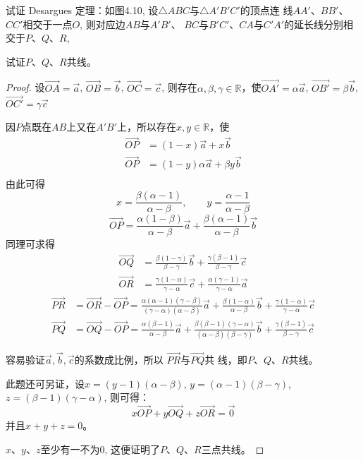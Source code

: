 \begin{example}
    试证 Desargues 定理：如图4.10, 设$\triangle ABC$与$\triangle A'B'C'$的顶点连
    线$AA'$、$BB'$、$CC'$相交于一点$O$, 则对应边$AB$与$A'B'$、
    $BC$与$B'C'$、$CA$与$C'A'$的延长线分别相交于$P$、$Q$、$R$, 
    
    试证$P$、$Q$、$R$共线。
\end{example}

\begin{proof}
    设$\Vec{OA}=\vec{a}$, $\Vec{OB}=\vec{b}$, $\Vec{OC}=\vec{c}$, 则存在$\alpha,\beta,\gamma\in \mathbb{R}$，使$\Vec{OA'}=\alpha\vec{a}$, $\Vec{OB'}=\beta\vec{b}$, $\Vec{OC'}=\gamma\vec{c}$

    因$P$点既在$AB$上又在$A'B'$上，所以存在$x,y\in\mathbb{R}$，使
\[\begin{split}
    \Vec{OP}&=(1-x)\vec{a}+x\vec{b}\\
    \Vec{OP}&=(1-y)\alpha\vec{a}+\beta y\vec{b}\\
\end{split}\]
由此可得
\[x=\frac{\beta(\alpha-1)}{\alpha-\beta},\qquad y=\frac{\alpha-1}{\alpha-\beta}\]
\begin{equation}
    \Vec{OP}=\frac{\alpha(1-\beta)}{\alpha-\beta}\vec{a}+\frac{\beta(\alpha-1)}{\alpha-\beta}\vec{b}
\end{equation}
同理可求得
\begin{align}
    \Vec{OQ}&=\frac{\beta(1-\gamma)}{\beta-\gamma}\vec{b}+\frac{\gamma(\beta-1)}{\beta-\gamma}\vec{c}\\
    \Vec{OR}&=\frac{\gamma(1-\alpha)}{\gamma-\alpha}\vec{c}+\frac{\alpha(\gamma-1)}{\gamma-\alpha}\vec{a}
\end{align}
\[\begin{split}
    \Vec{PR}&=\Vec{OR}-\Vec{OP}=\frac{\alpha(\alpha-1)(\gamma-\beta)}{(\gamma-\alpha)(\alpha-\beta)}\vec{a}+\frac{\beta(1-\alpha)}{\alpha-\beta}\vec{b}+\frac{\gamma(1-\alpha)}{\gamma-\alpha}\vec{c}\\
    \Vec{PQ}&=\Vec{OQ}-\Vec{OP}=\frac{\alpha(\beta-1)}{\alpha-\beta}\vec{a}+\frac{\beta(\beta-1)(\gamma-\alpha)}{(\alpha-\beta)(\beta-\gamma)}\vec{b}+\frac{\gamma(\beta-1)}{\beta-\gamma}\vec{c}
\end{split}\]

容易验证$\vec{a},\vec{b},\vec{c}$的系数成比例，所以
$\Vec{PR}$与$\Vec{PQ}$共
线，即$P$、$Q$、$R$共线。

此题还可另证，设$x=(y-1)(\alpha-\beta)$,
 $y=(\alpha-1)(\beta-\gamma)$, $z=(\beta-1)(\gamma-\alpha)$, 则可得：
\[x\Vec{OP}+y\Vec{OQ}+z\Vec{OR}=\vec{0}\]
并且$x+y+z=0$。

$x$、$y$、$z$至少有一不为0, 
这便证明了$P$、$Q$、$R$三点共线。
\end{proof}

